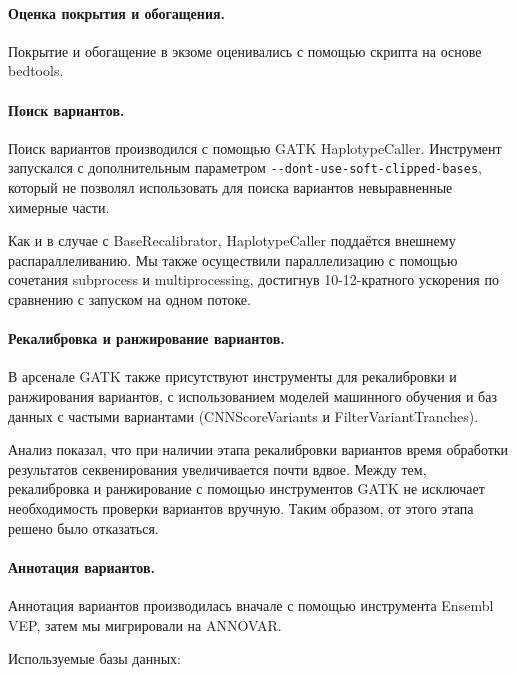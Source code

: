 \documentclass[a4paper,12pt]{article}
\begin{document}
\paragraph{Оценка покрытия и обогащения.}
Покрытие и обогащение в экзоме оценивались с помощью скрипта на основе bedtools\cite{bedtools}.

\paragraph{Поиск вариантов.}
Поиск вариантов производился с помощью GATK HaplotypeCaller.
Инструмент запускался с дополнительным параметром \verb|--dont-use-soft-clipped-bases|, который не позволял использовать для поиска вариантов невыравненные химерные части.

Как и в случае с BaseRecalibrator, HaplotypeCaller поддаётся внешнему распараллеливанию\cite{heldenbrand}.
Мы также осуществили параллелизацию с помощью сочетания subprocess и multiprocessing, достигнув 10-12-кратного ускорения по сравнению с запуском на одном потоке.

\paragraph{Рекалибровка и ранжирование вариантов.}
В арсенале GATK также присутствуют инструменты для рекалибровки и ранжирования вариантов, с использованием моделей машинного обучения и баз данных с частыми вариантами (CNNScoreVariants и FilterVariantTranches).

Анализ показал, что при наличии этапа рекалибровки вариантов время обработки результатов секвенирования увеличивается почти вдвое.
Между тем, рекалибровка и ранжирование с помощью инструментов GATK не исключает необходимость проверки вариантов вручную.
Таким образом, от этого этапа решено было отказаться.

\paragraph{Аннотация вариантов.}
Аннотация вариантов производилась вначале с помощью инструмента Ensembl VEP\cite{vep}, затем мы мигрировали на ANNOVAR\cite{annovar}.

Используемые базы данных:
\end{document}
